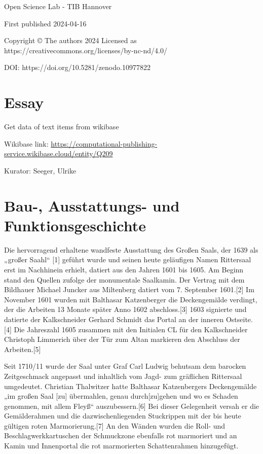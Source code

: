 \documentclass[
  letterpaper,
]{book}
\begin{document}
Open Science Lab - TIB Hannover

First published 2024-04-16

Copyright © The authors 2024 Licensed as
https://creativecommons.org/licenses/by-nc-nd/4.0/

DOI: https://doi.org/10.5281/zenodo.10977822


\chapter{Essay}\label{essay}

Get data of text items from wikibase

Wikibase link:
\url{https://computational-publishing-service.wikibase.cloud/entity/Q209}

Kurator: Seeger, Ulrike


\chapter{Bau-, Ausstattungs- und
Funktionsgeschichte}\label{bau--ausstattungs--und-funktionsgeschichte}

Die hervorragend erhaltene wandfeste Ausstattung des Großen Saals, der
1639 als „großer Saahl`` {[}1{]} geführt wurde und seinen heute
geläufigen Namen Rittersaal erst im Nachhinein erhielt, datiert aus den
Jahren 1601 bis 1605. Am Beginn stand den Quellen zufolge der
monumentale Saalkamin. Der Vertrag mit dem Bildhauer Michael Juncker aus
Miltenberg datiert vom 7. September 1601.{[}2{]} Im November 1601 wurden
mit Balthasar Katzenberger die Deckengemälde verdingt, der die Arbeiten
13 Monate später Anno 1602 abschloss.{[}3{]} 1603 signierte und datierte
der Kalkschneider Gerhard Schmidt das Portal an der inneren
Ostseite.{[}4{]} Die Jahreszahl 1605 zusammen mit den Initialen CL für
den Kalkschneider Christoph Limmerich über der Tür zum Altan markieren
den Abschluss der Arbeiten.{[}5{]}

Seit 1710/11 wurde der Saal unter Graf Carl Ludwig behutsam dem barocken
Zeitgeschmack angepasst und inhaltlich vom Jagd- zum gräflichen
Rittersaal umgedeutet. Christian Thalwitzer hatte Balthasar
Katzenbergers Deckengemälde „im großen Saal {[}zu{]} übermahlen, genau
durch{[}zu{]}gehen und wo es Schaden genommen, mit allem Fleyß``
auszubessern.{[}6{]} Bei dieser Gelegenheit versah er die Gemälderahmen
und die dazwischenliegenden Stuckrippen mit der bis heute gültigen roten
Marmorierung.{[}7{]} An den Wänden wurden die Roll- und
Beschlagwerkkartuschen der Schmuckzone ebenfalls rot marmoriert und an
Kamin und Innenportal die rot marmorierten Schattenrahmen hinzugefügt.
\end{document}
